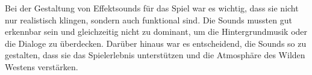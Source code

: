 Bei der Gestaltung von Effektsounds für das Spiel war es wichtig, dass sie nicht nur realistisch klingen, sondern auch funktional sind. Die Sounds mussten gut erkennbar sein und gleichzeitig nicht zu dominant, um die Hintergrundmusik oder die Dialoge zu überdecken.
Darüber hinaus war es entscheidend, die Sounds so zu gestalten, dass sie das Spielerlebnis unterstützen und die Atmosphäre des Wilden Westens verstärken.
%

\renewcommand{\kapitelautor}{}
